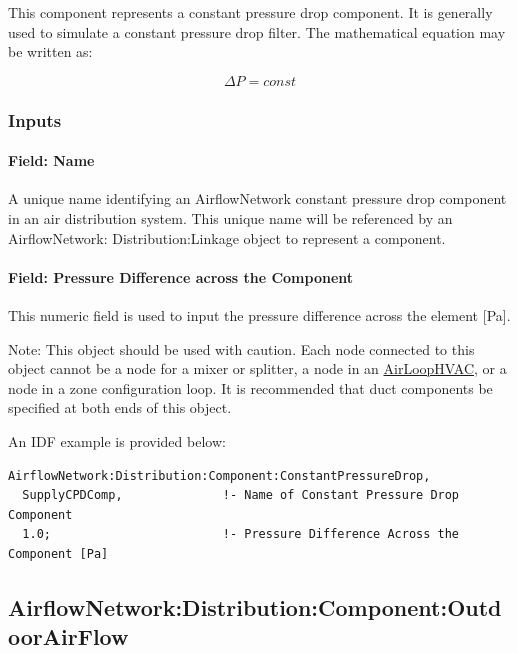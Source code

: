 This component represents a constant pressure drop component. It is generally used to simulate a constant pressure drop filter. The mathematical equation may be written as:

\begin{equation}
\Delta P = const
\end{equation}

\subsubsection{Inputs}\label{inputs-20}

\paragraph{Field: Name}\label{field-name-18}

A unique name identifying an AirflowNetwork constant pressure drop component in an air distribution system. This unique name will be referenced by an AirflowNetwork: Distribution:Linkage object to represent a component.

\paragraph{Field: Pressure Difference across the Component}\label{field-pressure-difference-across-the-component}

This numeric field is used to input the pressure difference across the element {[}Pa{]}.

Note: This object should be used with caution. Each node connected to this object cannot be a node for a mixer or splitter, a node in an \hyperref[airloophvac]{AirLoopHVAC}, or a node in a zone configuration loop. It is recommended that duct components be specified at both ends of this object.

An IDF example is provided below:

\begin{lstlisting}
AirflowNetwork:Distribution:Component:ConstantPressureDrop,
  SupplyCPDComp,              !- Name of Constant Pressure Drop Component
  1.0;                        !- Pressure Difference Across the Component [Pa]
\end{lstlisting}

\subsection{AirflowNetwork:Distribution:Component:OutdoorAirFlow}\label{airflowNetworkdistributioncomponentoutdoorairflow}


